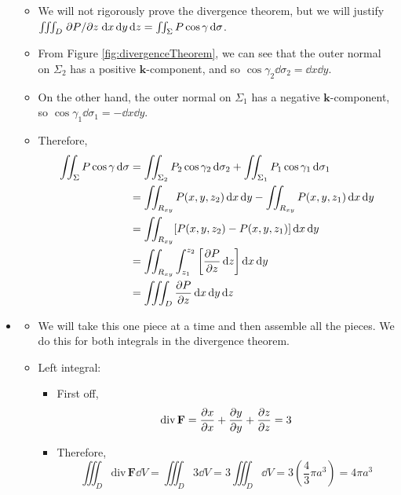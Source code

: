\documentclass[../main.tex]{subfiles}
\begin{document}
\begin{itemize}
    \begin{itemize}
        \item We will not rigorously prove the divergence theorem, but we will justify $\iiint_D\pdv*{P}{z}\dd{x}\dd{y}\dd{z}=\iint_\Sigma P\cos\gamma\dd{\sigma}$.
        \item From Figure \ref{fig:divergenceTheorem}, we can see that the outer normal on $\Sigma_2$ has a positive $\mathbf{k}$-component, and so $\cos\gamma_2\dd{\sigma_2}=\dd{x}\dd{y}$.
        \item On the other hand, the outer normal on $\Sigma_1$ has a negative $\mathbf{k}$-component, so $\cos\gamma_1\dd{\sigma_1}=-\dd{x}\dd{y}$.
        \item Therefore,
        \begin{align*}
            \iint_\Sigma P\cos\gamma\dd{\sigma} &= \iint_{\Sigma_2}P_2\cos\gamma_2\dd{\sigma_2}+\iint_{\Sigma_1}P_1\cos\gamma_1\dd{\sigma_1}\\
            &= \iint_{R_{xy}}P(x,y,z_2)\dd{x}\dd{y}-\iint_{R_{xy}}P(x,y,z_1)\dd{x}\dd{y}\\
            &= \iint_{R_{xy}}[P(x,y,z_2)-P(x,y,z_1)]\dd{x}\dd{y}\\
            &= \iint_{R_{xy}}\int_{z_1}^{z_2}\left[ \pdv{P}{z}\dd{z} \right]\dd{x}\dd{y}\\
            &= \iiint_D\pdv{P}{z}\dd{x}\dd{y}\dd{z}
        \end{align*}
    \end{itemize}
    \item {}
    \begin{itemize}
        \item We will take this one piece at a time and then assemble all the pieces. We do this for both integrals in the divergence theorem.
        \item Left integral:
        \begin{itemize}
            \item First off,
            \begin{equation*}
                \text{div}\,\mathbf{F} = \pdv{x}{x}+\pdv{y}{y}+\pdv{z}{z} = 3
            \end{equation*}
            \item Therefore,
            \begin{equation*}
                \iiint_D\text{div}\,\mathbf{F}\dd{V} = \iiint_D3\dd{V} = 3\iiint_D\dd{V} = 3\left( \frac{4}{3}\pi a^3 \right) = 4\pi a^3

\end{equation*}
\end{itemize}
\end{itemize}
\end{itemize}
\end{document}
